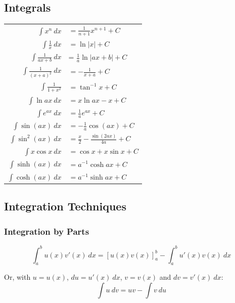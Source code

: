\subsection{Integrals}
\begin{tabular}[h]{rl}
    $\int x^n\ dx$               & $= \frac{1}{n+1}x^{n+1} + C$             \\
    $\int \frac{1}{x}\ dx$       & $= \ln |x| + C$                          \\
    $\int \frac{1}{ax + b}\ dx$  & = $\frac{1}{a} \ln |ax+b| + C$           \\
    $\int \frac{1}{(x+a)^2}\ dx$ & $= -\frac{1}{x+a} + C$                   \\
    $\int \frac{1}{1 + x^2}$     & $= \tan^{-1} x + C$                      \\
    $\int \ln ax\ dx$            & $= x\ln ax - x + C$                      \\
    $\int e^{ax}\ dx$            & $= \frac{1}{a} e^{ax} + C$               \\
    $\int \sin(ax)\ dx$          & $= -\frac{1}{a}\cos(ax) + C$             \\
    $\int \sin^2(ax)\ dx$        & $= \frac{x}{2}-\frac{\sin(2ax)}{4a} + C$ \\
    $\int x\cos x\ dx$           & $= \cos x + x\sin x + C$                 \\
    $\int \sinh(ax)\ dx$         & $= a^{-1}\cosh{ax} + C$                  \\
    $\int \cosh(ax)\ dx$         & $= a^{-1}\sinh{ax} + C$                  \\
\end{tabular}

\subsection{Integration Techniques}

\subsubsection{Integration by Parts}
\begin{equation*}
    \int_a^b u(x)v'(x)\ dx = \left[ u(x)v(x) \right]_a^b-\int_a^bu'(x)v(x)\ dx
\end{equation*}

Or, with $u=u(x)$, $du=u'(x)\ dx$, $v=v(x)$ and $dv=v'(x)\ dx$:
\begin{equation*}
    \int u\ dv=uv - \int v\ du
\end{equation*}

